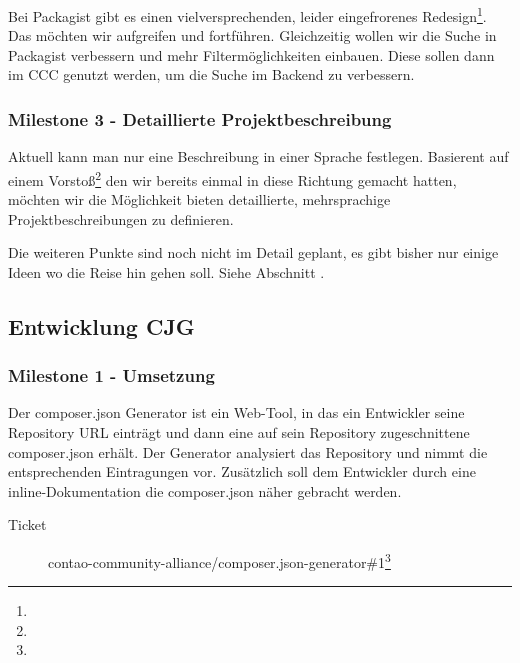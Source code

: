 \documentclass[
paper=a4,
draft=false,%
fontsize=10pt%
]{scrartcl}
\begin{document}
Bei Packagist gibt es einen vielversprechenden, leider eingefrorenes Redesign\footnote{}. Das möchten wir aufgreifen und fortführen. Gleichzeitig wollen wir die Suche in Packagist verbessern und mehr Filtermöglichkeiten einbauen. Diese sollen dann im CCC  genutzt werden, um die Suche im Backend zu verbessern.

\subsubsection{Milestone 3 - Detaillierte Projektbeschreibung}
\label{subsec:ccr-milestone-3}

Aktuell kann man nur eine  Beschreibung in einer Sprache festlegen. Basierent auf einem Vorstoß\footnote{} den wir bereits einmal in diese Richtung gemacht hatten, möchten wir die Möglichkeit bieten detaillierte, mehrsprachige Projektbeschreibungen zu definieren.

\vspace{1cm}

\begin{info}
Die weiteren Punkte sind noch nicht im Detail geplant, es gibt bisher nur einige Ideen wo die Reise hin gehen soll. Siehe Abschnitt .
\end{info}

\pagebreak

\subsection{Entwicklung CJG}
\label{subsec:cjg}

\subsubsection{Milestone 1 - Umsetzung}
\label{subsec:cjg-milestone-1}

Der composer.json Generator ist ein Web-Tool, in das ein Entwickler seine Repository URL einträgt und dann eine auf sein Repository zugeschnittene composer.json erhält. Der Generator analysiert das Repository und nimmt die entsprechenden Eintragungen vor. Zusätzlich soll dem Entwickler durch eine inline-Dokumentation die composer.json näher gebracht werden.

\begin{description}
\item[Ticket] contao-community-alliance/composer.json-generator\#1\footnote{}
\end{description}
\end{document}
